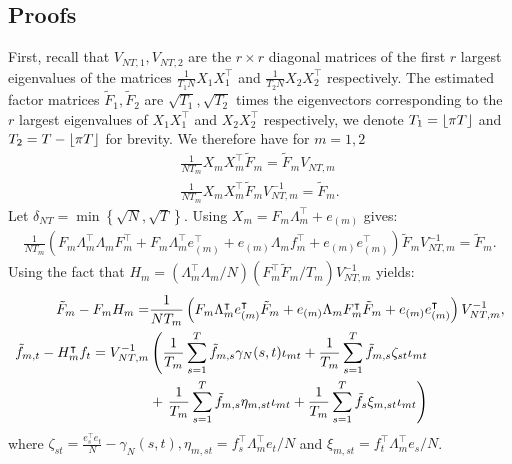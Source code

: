 \documentclass[12pt]{article}
\newcommand*{\tran}{\intercal}
\theoremstyle{plain}
\numberwithin{equation}{section}
\begin{document}
\subsection{Proofs}
First, recall that $V_{NT, 1}, V_{NT, 2}$ are the $r \times r$ diagonal matrices of the first $r$ largest eigenvalues of the matrices $\frac{1}{T_1 N} X_1 X_1^\tran$ and $\frac{1}{T_2 N} X_2 X_2^\tran$ respectively. The estimated factor matrices $\tilde{F}_1, \tilde{F}_2$ are $\sqrt{T_1}, \sqrt{T_2}$ times the eigenvectors corresponding to the $r$ largest eigenvalues of $X_1 X_1^\tran$ and $X_2 X_2^\tran$ respectively, we denote $T_1 = \left \lfloor \pi T \right \rfloor$ and $T_2 = T - \left \lfloor \pi T \right \rfloor$ for brevity. We therefore have for $m = 1, 2$
\begin{align*}
\frac{1}{NT_m} X_m X_m^\tran \tilde{F}_m = \tilde{F}_m V_{NT, m} \\
\frac{1}{NT_m} X_m X_m^\tran \tilde{F}_m V_{NT, m}^{-1} = \tilde{F}_m.
\end{align*}
Let $\delta_{NT} = \operatorname{min}\left\lbrace \sqrt{N}, \sqrt{T} \right\rbrace$. Using $X_m = F_m \Lambda_m^\tran + e_{(m)}$ gives:
\begin{align}
\frac{1}{N T_m}(
F_m \Lambda_m^\tran \Lambda_m F_m^\tran + F_m \Lambda_m^\tran e_{(m)}^\tran + e_{(m)} \Lambda_m f_m^\tran + e_{(m)} e_{(m)}^\tran) \tilde{F}_m V_{NT, m}^{-1} = \tilde{F}_m.
\end{align}
Using the fact that $H_m = (\Lambda_m^\tran \Lambda_m/N)(F_m^\tran \tilde{F}_m/T_m)V_{NT, m}^{-1}$ yields:
\begin{align}
\tilde{F}_m - F_m H_m = 
&\frac{1}{N T_m} \left(
F_m \Lambda_m^\tran e_{(m)}^\tran \tilde{F}_m + 
e_{(m)} \Lambda_m F_m^\tran \tilde{F}_m + 
e_{(m)} e_{(m)}^\tran \right) V_{NT, m}^{-1}, \\
\label{eqn:bai_four_terms}
\tilde{f}_{m, t} - H_m^\tran f_t = V_{NT, m}^{-1} & \left(
\frac{1}{T_m} \sumTs \tilde{f}_{m, s} \gamma_N(s, t) \iota_{mt} + 
\frac{1}{T_m} \sumTs \tilde{f}_{m, s} \zeta_{st} \iota_{mt} \right. \\
& + \left. \frac{1}{T_m} \sumTs \tilde{f}_{m, s} \eta_{m, st} \iota_{mt} +
\frac{1}{T_m} \sumTs \tilde{f}_s \xi_{m, st} \iota_{mt}
\right) \nonumber
\end{align}
where $\zeta_{st} = \frac{e_s^\tran e_t}{N} - \gamma_N(s, t), \eta_{m, st} = f_s^\tran \Lambda_m^\tran e_t / N$ and $\xi_{m, st} = f_t^\tran \Lambda_m^\tran e_s/N$.
\end{document}
